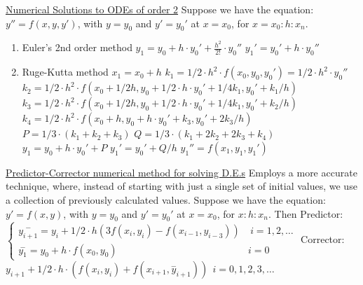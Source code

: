 \documentclass[12pt]{article}
\begin{document}
\begin{flushleft}
	\uline{Numerical Solutions to ODEs of order 2} \linebreak 
	\textbullet \quad Suppose we have the equation: $y''= f(x,y,y')$, with $y=y_0$ and $y' = y_0'$ at $x=x_0$, for $x=x_0:h:x_n$.  
	\begin{enumerate}
	\item Euler's 2nd order method \linebreak 
	$\displaystyle y_1 = y_0 + h \cdot y_0' + \frac{h^2}{2!} \cdot y_0''$ \linebreak 
	$\displaystyle y_1' = y_0' + h\cdot y_0''$
	\item Ruge-Kutta method \linebreak 
	$\displaystyle x_1 = x_0 + h$ \linebreak 
	$\displaystyle k_1 = 1/2 \cdot h^2 \cdot f(x_0, y_0, y_0') = 1/2 \cdot h^2 \cdot y_0''$ \linebreak 
	$\displaystyle k_2 = 1/2 \cdot h^2 \cdot f(x_0 + 1/2 h, y_0 + 1/2 \cdot h \cdot y_0' + 1/4 k_1, y_0' + k_1 / h)$ \linebreak 
	$\displaystyle k_3 = 1/2 \cdot h^2 \cdot f(x_0 + 1/2 h, y_0 + 1/2 \cdot h \cdot y_0' + 1/4 k_1, y_0' + k_2 / h)$ \linebreak 
	$\displaystyle k_4 = 1/2 \cdot h^2 \cdot f(x_0 + h, y_0 + h\cdot y_0' + k_3, y_0' + 2k_3 / h)$ \linebreak 
	$\displaystyle P = 1/3 \cdot (k_1 + k_2 + k_3)$ \linebreak 
	$\displaystyle Q= 1/3 \cdot (k_1 + 2k_2 + 2k_3 + k_4)$ \linebreak 
	$\displaystyle y_1 = y_0 + h\cdot y_0' + P$ \linebreak 
	$\displaystyle y_1' = y_0' + Q/h$ \linebreak 
	$\displaystyle y_1'' = f(x_1, y_1, y_1')$ 
	\end{enumerate}  
	
	\textbullet \quad \uline{Predictor-Corrector numerical method for solving D.E.s} \linebreak 
	Employs a more accurate technique, where, instead of starting with just a single set of initial values, we use a collection of previously calculated values. \linebreak 
	Suppose we have the equation: $y' = f(x,y)$, with $y=y_0$ and $y' = y_0'$ at $x=x_0$, for $x:h:x_n$. Then \linebreak 
	Predictor: $\displaystyle \begin{cases} 
											\overset{-}{y_{i+1}} = y_i + 1/2 \cdot h (3f(x_i,y_i) -f(x_{i-1},y_{i-3})) & \ i =1,2,\ldots \\ 
											\overset{-}{y_1} = y_0 + h \cdot f(x_0,y_0) & i=0 
											\end{cases}$ \linebreak 
	Corrector: $\displaystyle y_{i+1} + 1/2 \cdot h \cdot (f(x_i,y_i) + f(x_{i+1}, \overset{-}{y}_{i+1})) \ \ i=0,1,2,3,\ldots $ \linebreak 
	

\end{flushleft}
\end{document}
